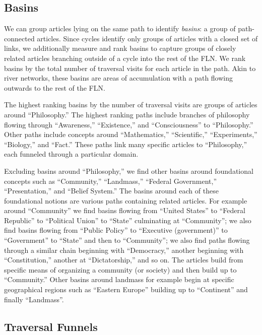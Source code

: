\documentclass[pre,twocolumn,twoside,superscriptaddress,floatfix, aps, 10pt]{revtex4-1}
\begin{document}
\subsection{Basins}

We can group articles lying on the same path to identify {\it basins}: 
a group of path-connected articles.
Since cycles identify only groups of articles with a closed set of links, 
we additionally measure and rank basins to capture groups of closely related
articles branching outside of a cycle into the rest of the FLN.
We rank basins by the total number of traversal visits for each article in the path. 
Akin to river networks, these basins are areas of accumulation with a path 
flowing outwards to the rest of the FLN.

The highest ranking basins by the number of traversal visits are groups of articles
around ``Philosophy.'' 
The highest ranking paths include branches of philosophy flowing through 
``Awareness,'' ``Existence,'' and ``Consciousness'' to ``Philosophy.'' Other paths
include concepts around ``Mathematics,'' ``Scientific,'' ``Experiments,'' 
``Biology,'' and ``Fact.''
These paths link many specific articles to ``Philosophy,'' each funneled through a particular domain.

Excluding basins around ``Philosophy,'' we find other basins around 
foundational concepts such as ``Community,'' ``Landmass,'' ``Federal Government,'' 
``Presentation,'' and ``Belief System.'' 
The basins around each of these foundational notions are 
various paths containing related articles. For example around 
``Community'' we find basins
flowing from ``United States'' to ``Federal Republic'' to ``Political Union'' to ``State'' culminating at ``Community''; we also find basins flowing from 
``Public Policy'' to ``Executive (government)'' to ``Government'' to ``State'' and then 
to ``Community''; we also find paths flowing through a similar chain beginning
with ``Democracy,'' another beginning with ``Constitution,'' another at 
``Dictatorship,'' and so on. The articles build from specific means of organizing
a community (or society) and then build up to ``Community.'' 
Other basins around landmass for example begin at specific geographical regions
such as ``Eastern Europe'' building up to ``Continent'' and finally ``Landmass''.


\subsection{Traversal Funnels}
\end{document}

